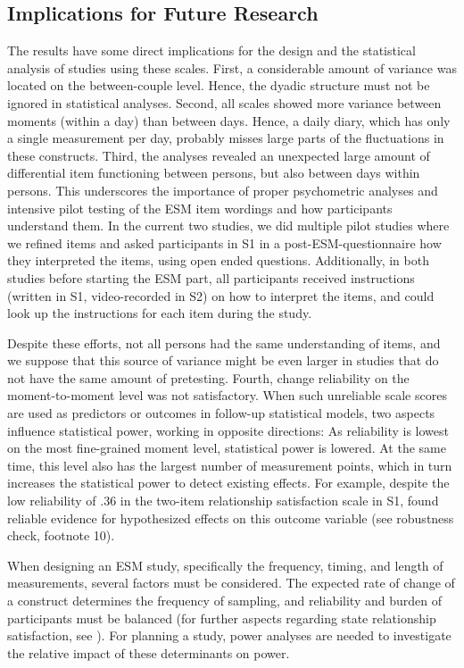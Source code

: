 \documentclass[jou,a4paper,draftfirst]{apa6}\usepackage[]{graphicx}\usepackage[]{color}
\begin{document}
\subsection{Implications for Future Research}

The results have some direct implications for the design and the statistical analysis of studies using these scales. 
First, a considerable amount of variance was located on the between-couple level. Hence, the dyadic structure must not be ignored in statistical analyses. 
Second, all scales showed more variance between moments (within a day) than between days. Hence, a daily diary, which has only a single measurement per day, probably misses large parts of the fluctuations in these constructs.
Third, the analyses revealed an unexpected large amount of differential item functioning between persons, but also between days within persons.
This underscores the importance of proper psychometric analyses and intensive pilot testing of the ESM item wordings and how participants understand them. In the current two studies, we did multiple pilot studies where we refined items and asked participants in S1 in a post-ESM-questionnaire how they interpreted the items, using open ended questions. Additionally, in both studies before starting the ESM part, all participants received instructions (written in S1, video-recorded in S2) on how to interpret the items, and could look up the instructions for each item during the study. 

Despite these efforts, not all persons had the same understanding of items, and we suppose that this source of variance might be even larger in studies that do not have the same amount of pretesting.
Fourth, change reliability on the moment-to-moment level was not satisfactory. When such unreliable scale scores are used as predictors or outcomes in follow-up statistical models, two aspects influence statistical power, working in opposite directions: As reliability is lowest on the most fine-grained moment level, statistical power is lowered. At the same time, this level also has the largest number of measurement points, which in turn increases the statistical power to detect existing effects. For example, despite the low reliability of .36 in the two-item relationship satisfaction scale in S1, \textcite{zygar_MotiveDispositionsStates_2018} found reliable evidence for hypothesized effects on this outcome variable (see robustness check, footnote 10).


When designing an ESM study, specifically the frequency, timing, and length of measurements, several factors must be considered. The expected rate of change of a construct determines the frequency of sampling, and reliability and burden of participants must be balanced (for further aspects regarding state relationship satisfaction, see ). For planning a study, power analyses are needed to investigate the relative impact of these determinants on power. 
\end{document}
